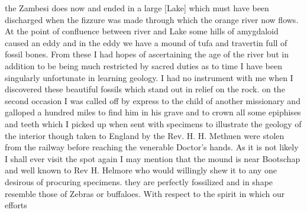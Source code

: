 \documentclass[11pt,twoside]{article}\makeatletter
\begin{document}
the Zambesi does now and  \newline ended in a large [Lake] which must have  \newline been discharged when the fizzure was  \newline made through which the orange river  \newline now flows. At the point of confluence  \newline between river and Lake some hills {\newline \newline \noindent [0013]}  \newline of amygdaloid caused an eddy and  \newline in the eddy we have a mound of tufa  \newline and travertin full of fossil bones. From  \newline these I had hopes of ascertaining the age  \newline of the river but in addition to be being  \newline much restricted by sacred duties as to  \newline time I have been singularly unfortunate  \newline in learning geology. I had no instrument  \newline with me when I discovered these beautiful  \newline fossils which stand out in relief on the  \newline rock. on the second occasion I was  \newline called off by express to the child of another  \newline missionary and galloped a hundred miles  \newline to find him in his grave and to crown  \newline all some epiphises and teeth which I picked up  \newline when sent with specimens to illustrate  \newline the geology of the interior though taken  \newline to England by the Rev. H. H. Methuen  \newline were stolen from the railway before  \newline reaching the venerable Doctor's hands.  \newline As it is not likely I shall ever visit  \newline the spot again I may mention that  \newline the mound is near Bootschap and  \newline well known to Rev H. Helmore who {\newline \newline \noindent [0014]}  \newline would willingly shew it to any one desirous  \newline of procuring specimens. they are perfectly  \newline fossilized and in shape resemble those of  \newline Zebras or buffaloes. \newline  \indent With respect to the spirit in which  \newline our efforts 
\end{document}
